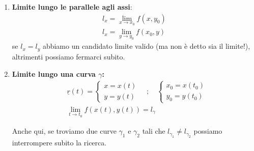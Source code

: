  \begin{enumerate}
 	\item \textbf{Limite lungo le parallele agli assi}:
 	\begin{align}
 	l_x = \underset{x\rightarrow x_0}{\lim} f(x,y_0) \\
 	l_x = \underset{y\rightarrow y_0}{\lim} f(x_0,y) 
 	\end{align}
 	se $l_x=l_y$ abbiamo un candidato limite valido (ma non è detto sia il limite!), altrimenti possiamo fermarci subito.
 	
 	\item \textbf{Limite lungo una curva $\gamma$:}
 	\begin{align}
 	{}&\underline{r}(t) = \left\{
 	\begin{array}{cc}
 	x=x(t)\\
 	y=y(t)
 	\end{array}
 	\right. 	\quad ; \quad \left\{
 	\begin{array}{cc}
 	x_0=x(t_0)\\
 	y_0=y(t_0)
 	\end{array}
 	\right. \\
 	&\underset{t\rightarrow t_0}{\lim}f(x(t),y(t))=l_\gamma
 	\end{align}
 	
 	Anche qui, se troviamo due curve $\gamma_1$ e $\gamma_2$ tali che $l_{\gamma_1} \neq l_{\gamma_2}$ possiamo interrompere subito la ricerca.
 \end{enumerate}

